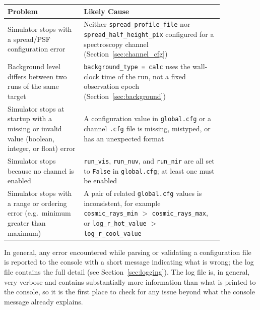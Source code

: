 \begin{center}
    \begin{tabular}{>{\raggedright\arraybackslash}p{0.30\linewidth} >{\raggedright\arraybackslash}p{0.55\linewidth}}
        \toprule
        \textbf{Problem}                                                                              & \textbf{Likely Cause}                                                                                                                                                                                \\
        \midrule
        Simulator stops with a spread/PSF configuration error                                         & Neither \texttt{spread\_profile\_file} nor \texttt{spread\_half\_height\_pix} configured for a spectroscopy channel (Section~\ref{sec:channel_cfg})                                                  \\
        \midrule
        Background level differs between two runs of the same target                                  & \texttt{background\_type = calc} uses the wall-clock time of the run, not a fixed observation epoch (Section~\ref{sec:background})                                                                   \\
        \midrule
        Simulator stops at startup with a missing or invalid value (boolean, integer, or float) error & A configuration value in \texttt{global.cfg} or a channel \texttt{.cfg} file is missing, mistyped, or has an unexpected format                                                                       \\
        \midrule
        Simulator stops because no channel is enabled                                                 & \texttt{run\_vis}, \texttt{run\_nuv}, and \texttt{run\_nir} are all set to \texttt{False} in \texttt{global.cfg}; at least one must be enabled                                                       \\
        \midrule
        Simulator stops with a range or ordering error (e.g.\ minimum greater than maximum)           & A pair of related \texttt{global.cfg} values is inconsistent, for example \texttt{cosmic\_rays\_min} $>$ \texttt{cosmic\_rays\_max}, or \texttt{log\_r\_hot\_value} $>$ \texttt{log\_r\_cool\_value} \\
        \bottomrule
    \end{tabular}
\end{center}

\noindent In general, any error encountered while parsing or validating a configuration file is reported to the console with a short message indicating what is wrong; the log file contains the full detail (see Section~\ref{sec:logging}). The log file is, in general, very verbose and contains substantially more information than what is printed to the console, so it is the first place to check for any issue beyond what the console message already explains.

